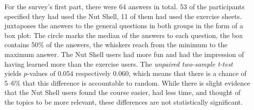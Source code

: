 \documentclass[paper=a4,twoside,abstract=on,cleardoublepage=empty,numbers=noenddot,toc=bib,12pt,appendixprefix=true]{scrreprt}
\begin{document}
For the survey's first part, there were 64 answers in total. 53 of the participants specified they had used the Nut Shell, 11 of them had used the exercise sheets.  juxtaposes the answers to the general questions in both groups in the form of a box plot: The circle marks the median of the answers to each question, the box contains 50\% of the answers, the whiskers reach from the minimum to the maximum answer. The Nut Shell users had more fun and had the impression of having learned more than the exercise users. The \emph{unpaired two-sample t-test} \cite{student08} yields $p$-values of $0.054$ respectively $0.060$, which means that there is a chance of 5--6\% that this difference is accountable to random. While there is slight evidence that the Nut Shell users found the course easier, had less time, and thought of the topics to be more relevant, these differences are not statistically significant.
\end{document}
